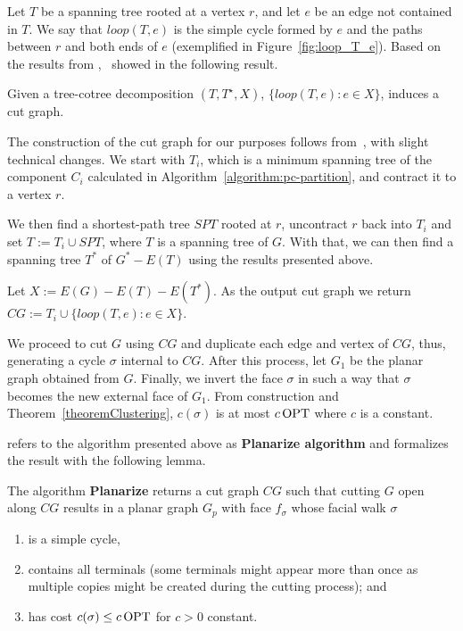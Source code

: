 Let \(T\) be a spanning tree rooted at a vertex \(r\), and let \(e\) be an edge not contained in \(T\). We say that \(loop(T, e)\) is the simple cycle formed by \(e\) and the paths between \(r\) and both ends of \(e\) (exemplified in Figure~\ref{fig:loop_T_e}). Based on the results from \citeauthor{Eppstein},~\cite{Borradaile2012} showed in the following result.

\begin{flemma}
    Given a tree-cotree decomposition \((T, T^{\star}, X)\), \(\{loop(T, e): e \in X\}\), induces a cut graph.
\end{flemma}

The construction of the cut graph for our purposes follows from~\cite{Borradaile2012}, with slight technical changes. We start with \(T_i\), which is a minimum spanning tree of the component \(C_i\) calculated in Algorithm~\ref{algorithm:pc-partition}, and contract it to a vertex \(r\).

We then find a shortest-path tree \(SPT\) rooted at \(r\), uncontract \(r\) back into \(T_i\) and set \(T := T_i \cup SPT\), where \(T\) is a spanning tree of \(G\). With that, we can then find a spanning tree \(T^\ast\) of \(G^\ast - E(T)\) using the results presented above.

Let \(X := E(G) - E(T) - E(T^\ast)\). As the output cut graph we return \(CG := T_i \cup \{loop(T, e): e \in X\}\).

We proceed to cut \(G\) using \(CG\) and duplicate each edge and vertex of \(CG\), thus, generating a cycle \(\sigma\) internal to \(CG\). After this process, let \(G_1\) be the planar graph obtained from \(G\). Finally, we invert the face \(\sigma\) in such a way that \(\sigma\) becomes the new external face of \(G_1\). From construction and Theorem~\ref{theoremClustering}, \(c(\sigma)\) is at most \(c \operatorname{\textrm{OPT}}\) where \(c\) is a constant.

\citeauthor{Borradaile2012} refers to the algorithm presented above as \textbf{Planarize algorithm} and formalizes the result with the following lemma.

\begin{flemma}
    The algorithm \textbf{Planarize} returns a cut graph \(CG\) such that cutting \(G\) open along \(CG\) results in a planar graph \(G_p\) with face \(f_\sigma\) whose facial walk \(\sigma\)

    \begin{enumerate}
        \item is a simple cycle,
        \item contains all terminals (some terminals might appear more than once as multiple copies might be created during the cutting process); and
        \item has cost \(c(\sigma) \leq c \operatorname{\textrm{OPT}}\) for \(c > 0\) constant.
    \end{enumerate}
\end{flemma}

